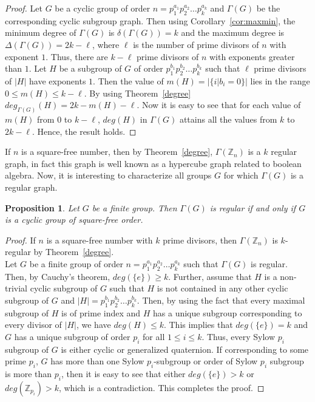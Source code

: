 \documentclass[11pt,twoside]{amsart}
\def \Z {{\mathbb{Z}}}
\def \Ga {{\Gamma }}
\newtheorem{pro}[theorem]{Proposition}
\begin{document}
       \begin{proof}
        Let $G$ be a cyclic group of order $n=p_1^{a_1} p_2^{a_2}\dots p_k^{a_k}$ and $\Gamma (G)$ be the corresponding cyclic subgroup graph. Then using Corollary~\ref{cor:maxmin}, the minimum degree of $\Gamma (G)$ is $\delta (\Gamma (G))=k$ and the maximum degree is $\Delta (\Gamma (G))=2k-\ell$, where $\ell$ is the number of prime divisors of $n$ with exponent $1$. Thus, there are $k-\ell$ prime divisors of $n$ with exponents greater than $1$. Let $H$ be a subgroup of $G$ of order $p_1^{b_1} p_2^{b_2}\dots p_k^{b_k}$ such that $\ell$ prime divisors of $|H|$ have exponents $1$. Then the value of $m(H)=|\{i|b_i=0\}|$ lies in the range $0\leq m(H)\leq k-\ell$. By using Theorem~\ref{degree} $deg_{\Gamma (G)}(H)=2k-m(H)-\ell$. Now it is easy to see that for each value of $m(H)$ from $0$ to $k-\ell$, $deg (H)$ in $\Gamma (G)$ attains all the values from $k$ to $2k-\ell$. Hence, the result holds.
        \end{proof}
        If $n$ is a square-free number, then by Theorem~\ref{degree}, $\Ga(\Z_n)$ is a $k$ regular graph, in fact this graph is well known as a hypercube graph related to boolean algebra. Now, it is interesting to characterize all groups $G$ for which $\Ga(G)$ is a regular graph.
\begin{pro}\label{thm:regular}
    Let $G$ be a finite group. Then $\Gamma (G)$ is regular if and only if $G$ is a cyclic group of square-free order.
\end{pro}
\begin{proof}
If $n$ is a square-free number with $k$ prime divisors, then $\Ga (\Z_n)$ is $k$-regular by Theorem~\ref{degree}.\\
     Let $G$ be a finite group of order $n=p_1^{a_1}p_2^{a_2}\ldots p_k^{a_k}$ such that $\Gamma (G)$ is regular. Then, by Cauchy's theorem, $deg (\{e\})\geq k$. Further, assume that $H$ is a non-trivial cyclic subgroup of $G$ such that $H$ is not contained in any other cyclic subgroup of $G$ and $|H|=p_1^{b_1}p_2^{b_2}\ldots p_k^{b_k}$. Then, by using the fact that every maximal subgroup of $H$ is of prime index and $H$ has a unique subgroup corresponding to every divisor of $|H|$, we have $deg (H)\leq k$. This implies that $deg (\{e\})=k$ and $G$ has a unique subgroup of order $p_i$ for all $1\leq i\leq k$. Thus, every Sylow $p_i$ subgroup of $G$ is either cyclic or generalized quaternion.
 If corresponding to some prime $p_i$, $G$ has more than one Sylow $p_i$-subgroup or order of Sylow $p_i$ subgroup is more than $p_i$, then it is easy to see that either $deg (\{e\})>k$ or $deg (\Z_{p_i})>k$, which is a contradiction. This completes the proof.
\end{proof}
\end{document}
